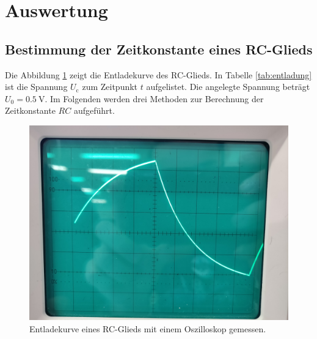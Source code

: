\section{Auswertung}
\label{sec:Auswertung}

\subsection{Bestimmung der Zeitkonstante eines RC-Glieds}
Die Abbildung \ref{fig:entladung} zeigt die Entladekurve des RC-Glieds.
In Tabelle \ref{tab:entladung} ist die Spannung $U_\text{c}$ zum Zeitpunkt $t$ aufgelistet.
Die angelegte Spannung beträgt $U_0 = \SI{0.5}{\volt}$. Im Folgenden werden drei Methoden
zur Berechnung der Zeitkonstante $RC$ aufgeführt.
\begin{figure}
    \centering
    \includegraphics[width=\textwidth]{content/data/entlade.jpg}
    \caption{Entladekurve eines RC-Glieds mit einem Oszilloskop gemessen.}
    \label{fig:entladung}
\end{figure}
